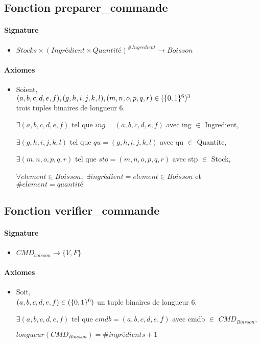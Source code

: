 \documentclass[]{article}
\begin{document}
\subsection*{Fonction preparer\_commande}
\paragraph{Signature}
\begin{itemize}
\item
  $Stocks \times (Ingrédient \times Quantité)^{\#Ingredient} \longrightarrow  Boisson$
\end{itemize}
\paragraph{Axiomes}
\begin{itemize}
\item
  Soient, \\ $(a,b,c,d,e,f), (g,h,i,j,k,l), (m,n,o,p,q,r)
 \in(\{0,1\}\textsuperscript{6})\textsuperscript{3}$ \\trois tuples binaires de longueur 6.

$\exists (a,b,c,d,e,f)$ tel que $ing = (a,b,c,d,e,f)$ avec ing $\in$ Ingredient,

$\exists (g,h,i,j,k,l)$ tel que $qu =(g,h,i,j,k,l)$ avec qu $\in$ Quantite,

$\exists (m,n,o,p,q,r)$ tel que $sto = (m,n,o,p,q,r)$ avec stp $\in$ Stock,

$\forall element \in Boisson,$ $\exists ingrédient=element \in Boisson$ et $\#element = quantité$
\end{itemize}
\pagebreak

\subsection*{Fonction verifier\_commande}
\paragraph{Signature}
\begin{itemize}
\item
  $CMD_{boisson} \longrightarrow  \{V, F\}$
\end{itemize}
\paragraph{Axiomes}
\begin{itemize}
\item
  Soit, \\ $(a,b,c,d,e,f) \in(\{0,1\}\textsuperscript{6})$ un tuple binaires de longueur 6.

$\exists (a,b,c,d,e,f)$ tel que $cmdb = (a,b,c,d,e,f)$ avec cmdb $\in$ $CMD_{Boisson}$,

$longueur(CMD_{Boisson}) = \# ingrédients + 1$
\end{itemize}
\end{document}
